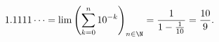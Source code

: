 \[
 1.1111\cdots = \lim\left( \sum_{k=0}^{n} 10^{-k}\right)_{n\in \N} = \frac{1}{1-\frac{1}{10}} = \frac{10}{9}. 
\]
